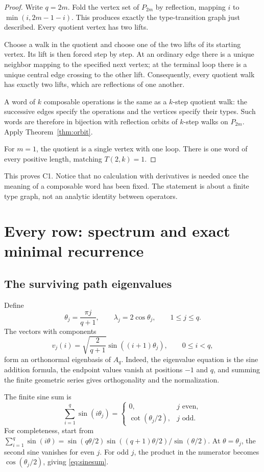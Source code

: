 \documentclass[11pt,letterpaper]{article}
\numberwithin{equation}{section}
\theoremstyle{definition}
\begin{document}
\begin{proof}
Write $q=2m$.  Fold the vertex set of $P_{2m}$ by reflection, mapping
$i$ to $\min(i,2m-1-i)$.  This produces exactly the type-transition graph
just described.  Every quotient vertex has two lifts.

Choose a walk in the quotient and choose one of the two lifts of its
starting vertex.  Its lift is then forced step by step.  At an ordinary
edge there is a unique neighbor mapping to the specified next vertex;
at the terminal loop there is a unique central edge crossing to the
other lift.  Consequently, every quotient walk has exactly two lifts,
which are reflections of one another.

A word of $k$ composable operations is the same as a $k$-step quotient
walk: the successive edges specify the operations and the vertices
specify their types.  Such words are therefore in bijection with
reflection orbits of $k$-step walks on $P_{2m}$.  Apply
Theorem~\ref{thm:orbit}.

For $m=1$, the quotient is a single vertex with one loop.  There is one
word of every positive length, matching $T(2,k)=1$.
\end{proof}

This proves C1.  Notice that no calculation with derivatives is needed
once the meaning of a composable word has been fixed.  The statement is
about a finite type graph, not an analytic identity between operators.

\section{Every row: spectrum and exact minimal recurrence}
\label{sec:recurrences}

\subsection{The surviving path eigenvalues}
Define
\[
\theta_j=\frac{\pi j}{q+1},\qquad \lambda_j=2\cos\theta_j,
\qquad 1\le j\le q.
\]
The vectors with components
\[
v_j(i)=\sqrt{\frac2{q+1}}\sin((i+1)\theta_j),\qquad 0\le i<q,
\]
form an orthonormal eigenbasis of $A_q$.  Indeed, the eigenvalue equation
is the sine addition formula, the endpoint values vanish at positions
$-1$ and $q$, and summing the finite geometric series gives orthogonality
and the normalization.

The finite sine sum is
\begin{equation}\label{eq:sinesum}
\sum_{i=1}^{q}\sin(i\theta_j)=
\begin{cases}
0,&j\text{ even},\\
\cot(\theta_j/2),&j\text{ odd}.
\end{cases}
\end{equation}
For completeness, start from
$\sum_{i=1}^{q}\sin(i\theta)=
\sin(q\theta/2)\sin((q+1)\theta/2)/\sin(\theta/2)$.
At $\theta=\theta_j$, the second sine vanishes for even $j$.
For odd $j$, the product in the numerator becomes
$\cos(\theta_j/2)$, giving \eqref{eq:sinesum}.
\end{document}
